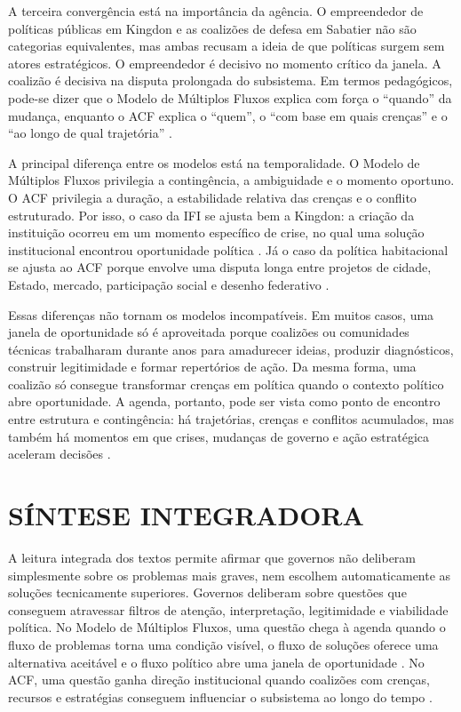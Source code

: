 \documentclass[12pt,a4paper]{article}
\begin{document}
A terceira convergência está na importância da agência. O empreendedor de políticas públicas em Kingdon e as coalizões de defesa em Sabatier não são categorias equivalentes, mas ambas recusam a ideia de que políticas surgem sem atores estratégicos. O empreendedor é decisivo no momento crítico da janela. A coalizão é decisiva na disputa prolongada do subsistema. Em termos pedagógicos, pode-se dizer que o Modelo de Múltiplos Fluxos explica com força o “quando” da mudança, enquanto o ACF explica o “quem”, o “com base em quais crenças” e o “ao longo de qual trajetória” \autocites{capella2022multiplos}[][]{araujoSilva2022coalizoes}.

A principal diferença entre os modelos está na temporalidade. O Modelo de Múltiplos Fluxos privilegia a contingência, a ambiguidade e o momento oportuno. O ACF privilegia a duração, a estabilidade relativa das crenças e o conflito estruturado. Por isso, o caso da IFI se ajusta bem a Kingdon: a criação da instituição ocorreu em um momento específico de crise, no qual uma solução institucional encontrou oportunidade política \autocite{bijos2024ifi}. Já o caso da política habitacional se ajusta ao ACF porque envolve uma disputa longa entre projetos de cidade, Estado, mercado, participação social e desenho federativo \autocite{ferreira2019habitacional}.

Essas diferenças não tornam os modelos incompatíveis. Em muitos casos, uma janela de oportunidade só é aproveitada porque coalizões ou comunidades técnicas trabalharam durante anos para amadurecer ideias, produzir diagnósticos, construir legitimidade e formar repertórios de ação. Da mesma forma, uma coalizão só consegue transformar crenças em política quando o contexto político abre oportunidade. A agenda, portanto, pode ser vista como ponto de encontro entre estrutura e contingência: há trajetórias, crenças e conflitos acumulados, mas também há momentos em que crises, mudanças de governo e ação estratégica aceleram decisões \autocites{kingdon2003agendas}[][]{sabatier1999theories}.

\section{SÍNTESE INTEGRADORA}
\label{sec:org5dadc6b}
A leitura integrada dos textos permite afirmar que governos não deliberam simplesmente sobre os problemas mais graves, nem escolhem automaticamente as soluções tecnicamente superiores. Governos deliberam sobre questões que conseguem atravessar filtros de atenção, interpretação, legitimidade e viabilidade política. No Modelo de Múltiplos Fluxos, uma questão chega à agenda quando o fluxo de problemas torna uma condição visível, o fluxo de soluções oferece uma alternativa aceitável e o fluxo político abre uma janela de oportunidade \autocites{kingdon2003agendas}[][]{capella2022multiplos}. No ACF, uma questão ganha direção institucional quando coalizões com crenças, recursos e estratégias conseguem influenciar o subsistema ao longo do tempo \autocites{sabatier1999theories}[][]{araujoSilva2022coalizoes}.
\end{document}
